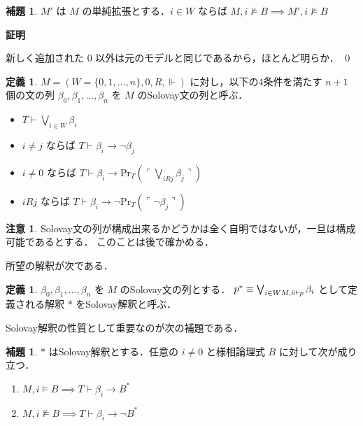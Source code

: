 \documentclass{jsarticle}
\makeatletter
\newcommand*{\Provable}{\mathrm{Pr}}
\theoremstyle{definition}
\newtheorem{lemma}[theorem]{補題}
\newtheorem{definition}[theorem]{定義}
\newtheorem{remark}[theorem]{注意}
\renewcommand{\proofname}{証明}
\renewenvironment{proof}[1][\proofname]{\par
    \normalfont 
    \topsep6\p@\@plus6\p@\relax
    \trivlist
    \item\relax
    {\bfseries\gtfamily
    #1\@addpunct{.}}\hspace\labelsep\ignorespaces
    }{%
    \endtrivlist
    \@endpefalse
}
\makeatother
\begin{document}
\begin{lemma}\label{lem:simple_extension}
    $M'$ は $M$ の単純拡張とする．$i \in W$ ならば $M,i \nvDash B \implies M',i \nvDash B$
\end{lemma}
\begin{proof}
    新しく追加された $0$ 以外は元のモデルと同じであるから，ほとんど明らか．
    \qed
\end{proof}

\begin{definition}
    $M = (W = \{0,1,\dots,n\}, 0, R, \Vdash)$ に対し，以下の4条件を満たす $n + 1$ 個の文の列 $\beta_0, \beta_1, \dots, \beta_n$ を $M$ のSolovay文の列と呼ぶ．
    \begin{itemize}
        \item $T \vdash \bigvee_{i \in W} \beta_i$
        \item $i \neq j$ ならば $T \vdash \beta_i \to \lnot \beta_j$
        \item $i \neq 0$ ならば $T \vdash \beta_i \to \Provable_T(\ulcorner \bigvee_{i R j} \beta_j \urcorner)$
        \item $i R j$ ならば $T \vdash \beta_i \to \lnot \Provable_T(\ulcorner \lnot \beta_j \urcorner)$ 
    \end{itemize}
\end{definition}

\begin{remark}
    Solovay文の列が構成出来るかどうかは全く自明ではないが，一旦は構成可能であるとする．
    このことは後で確かめる．
\end{remark}

所望の解釈が次である．

\begin{definition}
    $\beta_0, \beta_1, \dots, \beta_n$ を $M$ のSolovay文の列とする．
    $p^* \equiv \bigvee_{i \in W \\ M, i \Vdash p} \beta_i$ として定義される解釈 $*$ をSolovay解釈と呼ぶ．
\end{definition}

Solovay解釈の性質として重要なのが次の補題である．

\begin{lemma}\label{lem:solovay_interpretation}
    $*$ はSolovay解釈とする．任意の $i \neq 0$ と様相論理式 $B$ に対して次が成り立つ．
    \begin{enumerate}
        \item $M, i \vDash B \implies T \vdash \beta_i \to B^*$
        \item $M, i \nvDash B \implies T \vdash \beta_i \to \lnot B^*$
    \end{enumerate}
\end{lemma}
\end{document}
